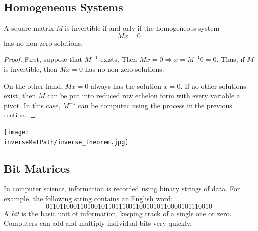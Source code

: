 
\subsection{Homogeneous Systems}

\begin{theorem}
A square matrix $M$ is invertible if and only if the homogeneous system \[Mx=0\] has no non-zero solutions.
\end{theorem}

\begin{proof}
First, suppose that $M^{-1}$ exists.  Then $Mx=0 \Rightarrow x=M^{-1}0=0$.  Thus, if $M$ is invertible, then $Mx=0$ has no non-zero solutions.

On the other hand, $Mx=0$ always has the solution $x=0$.  If no other solutions exist, then $M$ can be put into reduced row echelon form with every variable a pivot.  In this case, $M^{-1}$ can be computed using the process in the previous section.
\end{proof}

\begin{center}
\texttt{[image: \\inverseMatPath/inverse\_theorem.jpg]}
\end{center}


\subsection{Bit Matrices}
In computer science, information is recorded using binary strings of data.  For example, the following string contains an English word:
\[
011011000110100101101110011001010110000101110010
\]
A \hypertarget{bits}{\emph{bit}} is the basic unit of information, keeping track of a single one or zero.  Computers can add and multiply individual bits very quickly.

